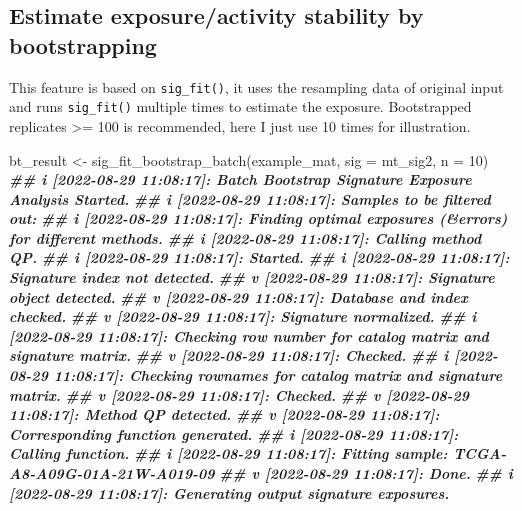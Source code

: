 \documentclass[
  12pt,
  a4paper,
  twoside]{book}
\newenvironment{Shaded}{\begin{snugshade}}{\end{snugshade}}
\newcommand{\AttributeTok}[1]{\textcolor[rgb]{0.77,0.63,0.00}{#1}}
\newcommand{\DecValTok}[1]{\textcolor[rgb]{0.00,0.00,0.81}{#1}}
\newcommand{\DocumentationTok}[1]{\textcolor[rgb]{0.56,0.35,0.01}{\textbf{\textit{#1}}}}
\newcommand{\FunctionTok}[1]{\textcolor[rgb]{0.00,0.00,0.00}{#1}}
\newcommand{\NormalTok}[1]{#1}
\newcommand{\OtherTok}[1]{\textcolor[rgb]{0.56,0.35,0.01}{#1}}
\begin{document}
\hypertarget{estimate-exposureactivity-stability-by-bootstrapping}{%
\subsection{Estimate exposure/activity stability by bootstrapping}\label{estimate-exposureactivity-stability-by-bootstrapping}}

This feature is based on \texttt{sig\_fit()}, it uses the resampling data of original input and runs \texttt{sig\_fit()} multiple times to estimate the exposure. Bootstrapped replicates \textgreater= 100 is recommended, here I just use 10 times for illustration.

\begin{Shaded}
\begin{Highlighting}[]
\NormalTok{bt\_result }\OtherTok{\textless{}{-}} \FunctionTok{sig\_fit\_bootstrap\_batch}\NormalTok{(example\_mat, }\AttributeTok{sig =}\NormalTok{ mt\_sig2, }\AttributeTok{n =} \DecValTok{10}\NormalTok{)}
\DocumentationTok{\#\# i [2022{-}08{-}29 11:08:17]: Batch Bootstrap Signature Exposure Analysis Started.}
\DocumentationTok{\#\# i [2022{-}08{-}29 11:08:17]: Samples to be filtered out:}
\DocumentationTok{\#\# i [2022{-}08{-}29 11:08:17]: Finding optimal exposures (\&errors) for different methods.}
\DocumentationTok{\#\# i [2022{-}08{-}29 11:08:17]: Calling method \textasciigrave{}QP\textasciigrave{}.}
\DocumentationTok{\#\# i [2022{-}08{-}29 11:08:17]: Started.}
\DocumentationTok{\#\# i [2022{-}08{-}29 11:08:17]: Signature index not detected.}
\DocumentationTok{\#\# v [2022{-}08{-}29 11:08:17]: Signature object detected.}
\DocumentationTok{\#\# v [2022{-}08{-}29 11:08:17]: Database and index checked.}
\DocumentationTok{\#\# v [2022{-}08{-}29 11:08:17]: Signature normalized.}
\DocumentationTok{\#\# i [2022{-}08{-}29 11:08:17]: Checking row number for catalog matrix and signature matrix.}
\DocumentationTok{\#\# v [2022{-}08{-}29 11:08:17]: Checked.}
\DocumentationTok{\#\# i [2022{-}08{-}29 11:08:17]: Checking rownames for catalog matrix and signature matrix.}
\DocumentationTok{\#\# v [2022{-}08{-}29 11:08:17]: Checked.}
\DocumentationTok{\#\# v [2022{-}08{-}29 11:08:17]: Method \textquotesingle{}QP\textquotesingle{} detected.}
\DocumentationTok{\#\# v [2022{-}08{-}29 11:08:17]: Corresponding function generated.}
\DocumentationTok{\#\# i [2022{-}08{-}29 11:08:17]: Calling function.}
\DocumentationTok{\#\# i [2022{-}08{-}29 11:08:17]: Fitting sample: TCGA{-}A8{-}A09G{-}01A{-}21W{-}A019{-}09}
\DocumentationTok{\#\# v [2022{-}08{-}29 11:08:17]: Done.}
\DocumentationTok{\#\# i [2022{-}08{-}29 11:08:17]: Generating output signature exposures.}

\end{Highlighting}
\end{Shaded}
\end{document}
